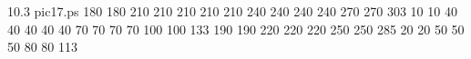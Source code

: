 10.3 pic17.ps 
{}{}{
 180 
 180 
 210 
 210 
 210 
 210 
 210 
 240 
 240 
 240 
 240 
 270 
 270 
 303 
 10 
 10 
 40 
 40 
 40 
 40 
 40 
 70 
 70 
 70 
 70 
 100 
 100 
 133 
 190 
 190 
 220 
 220 
 220 
 250 
 250 
 285 
 20 
 20 
 50 
 50 
 50 
 80 
 80 
 113 
}
